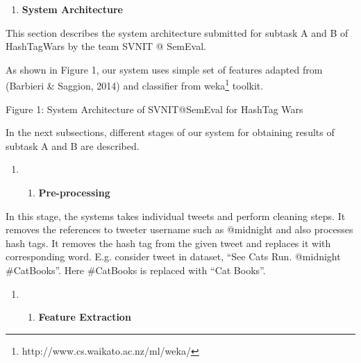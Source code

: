 \documentclass{article} %
\begin{document}
\begin{enumerate}
\item  \textbf{System Architecture}
\end{enumerate}

\noindent This section describes the system architecture submitted for subtask A and B of HashTagWars by the team SVNIT @ SemEval. 



\noindent As shown in Figure 1, our system uses simple set of features adapted from (Barbieri \& Saggion, 2014) and classifier from weka\footnote{ $  $http://www.cs.waikato.ac.nz/ml/weka/ } toolkit.

\noindent 

Figure 1: System Architecture of SVNIT@SemEval for HashTag Wars

In the next subsections, different stages of our system for obtaining results of subtask A and B are described.

\begin{enumerate}
\item \begin{enumerate}
\item  \textbf{Pre-processing}
\end{enumerate}
\end{enumerate}

\noindent In this stage, the systems takes individual tweets and perform cleaning steps. It removes the references to tweeter username such as @midnight and also processes hash tags. It removes the hash tag from the given tweet and replaces it with corresponding word. E.g. consider tweet in dataset, ``See Cats Run. @midnight \#CatBooks''. Here \#CatBooks is replaced with ``Cat Books''. 

\begin{enumerate}
\item \begin{enumerate}
\item  \textbf{Feature Extraction}
\end{enumerate}
\end{enumerate}
\end{document}
